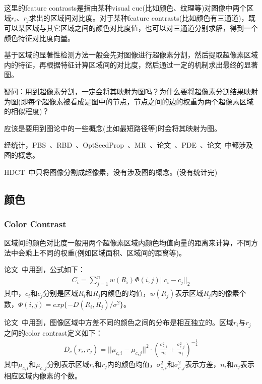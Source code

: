 \documentclass[12pt]{article}
\begin{document}
这里的feature contrasts是指由某种visual cue(比如颜色、纹理等)对图像中两个区域$r_i$、$r_j$求出的区域间对比度。对于某种feature contrasts(比如颜色有三通道)，既可以某区域与其它区域之间的颜色对比度值，也可以对三通道分别求解，得到一个颜色特征对比度向量。

基于区域的显著性检测方法一般会先对图像进行超像素分割，然后提取超像素区域内的特征，再根据特征计算区域间的对比度，然后通过一定的机制求出最终的显著图。

疑问：用到超像素分割，一定会将其映射为图吗？为什么要将超像素分割结果映射为图(即每个超像素被看成是图中的节点，节点之间的边的权重为两个超像素区域的相似程度)？

应该是要用到图论中的一些概念(比如最短路径等)时会将其映射为图。

经统计，PBS~\cite{yang2013graph}、RBD~\cite{zhu2014saliency}、OptSeedProp~\cite{lu2014learning}、MR~\cite{yang2013saliency}、论文~\cite{mairon2014closer}、PDE~\cite{liu2014adaptive}、论文~\cite{yan2013hierarchical}中都涉及图的概念。

HDCT~\cite{kim2014salient}中只将图像分割成超像素，没有涉及图的概念。(没有统计完)

\subsection{颜色}

\subsubsection{Color Contrast}

区域间的颜色对比度一般用两个超像素区域内颜色均值向量的距离来计算，不同方法中会乘上不同的权重(例如区域面积、区域间的距离等)。

论文~\cite{yan2013hierarchical}中用到，公式如下：
\begin{align}
C_i = \sum_{j=1}^{n}w(R_i)\Phi(i, j)||c_i-c_j||_2
\end{align}
其中，$c_i$和$c_j$分别是区域$R_i$和$R_j$内颜色的均值，$w(R_j)$表示区域$R_j$内的像素个数，$\Phi(i, j) = exp\{ -D(R_i, R_j)/\sigma^2\}$。

论文~\cite{zhu2014tag}中用到，图像区域中方差不同的颜色之间的分布是相互独立的。区域$r_i$与$r_j$之间的color contrast定义如下：
\begin{align}
D_c(r_i, r_j) = ||\mu_{c, i}-\mu_{c, j}||^2\cdot \left(\frac{\sigma_{c, i}^2}{n_i}+\frac{\sigma_{c, j}^2}{n_j}\right)^{-\frac{1}{2}}
\end{align}
其中$\mu_{c, i}$和$\mu_{c, j}$分别表示区域$r_i$和$r_j$内的颜色均值，$\sigma_{c, i}^2$和$\sigma_{c, j}^2$表示方差，$n_i$和$n_j$表示相应区域内像素的个数。
\end{document}
